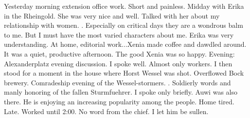 Yesterday morning extension office work. Short and painless. Midday with Erika in the Rheingold. She was very nice and well. Talked with her about my relationship with women. . Especially on critical days they are a wondrous balm to me. But I must have the most varied characters about me. Erika was very understanding. At home, editorial work...Xenia made coffee and dawdled around. It was a quiet, productive afternoon. The good Xenia was so happy. Evening: Alexanderplatz evening discussion. I spoke well. Almost only workers. I then stood for a moment in the house where Horst Wessel was shot. Overflowed Bock brewery. Comradeship evening of the Wessel-stormers. . Soldierly words and manly honoring of the fallen Sturmfuehrer. I spoke only briefly. Auwi was also there. He is enjoying an increasing popularity among the people. Home tired.  Late. Worked until 2:00. No word from the chief. I let him be sullen.

